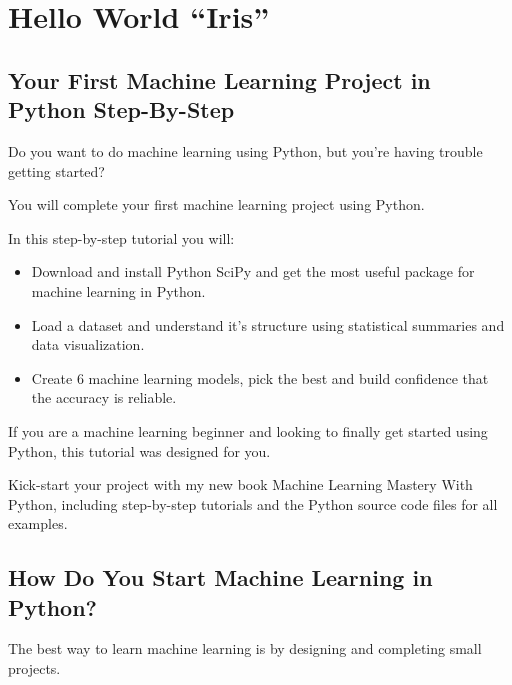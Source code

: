 %
%
%
%





\chapter{Hello World ``Iris''}

\section{Your First Machine Learning Project in Python Step-By-Step}

Do you want to do machine learning using Python, but you’re having trouble getting started?

You will complete your first machine learning project using Python.

In this step-by-step tutorial you will:

\begin{itemize}
  \item Download and install Python SciPy and get the most useful package for machine learning in Python.
  \item Load a dataset and understand it’s structure using statistical summaries and data visualization.
  \item Create 6 machine learning models, pick the best and build confidence that the accuracy is reliable.
\end{itemize}

If you are a machine learning beginner and looking to finally get started using Python, this tutorial was designed for you.

Kick-start your project with my new book Machine Learning Mastery With Python, including step-by-step tutorials and the Python source code files for all examples.

\section{How Do You Start Machine Learning in Python?}

The best way to learn machine learning is by designing and completing small projects.
    
